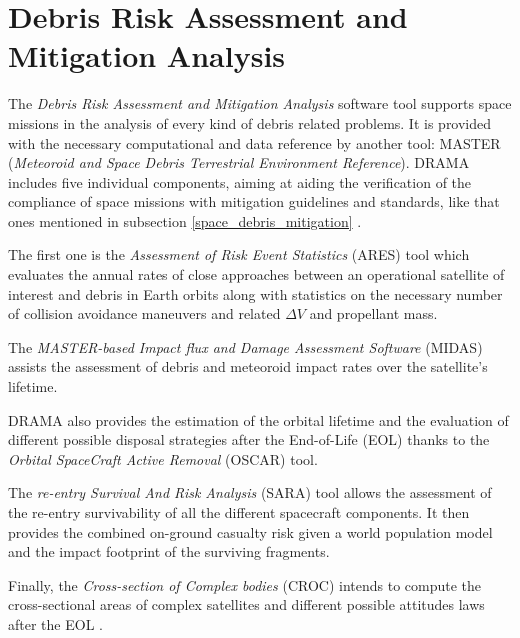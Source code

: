 \section{Debris Risk Assessment and Mitigation Analysis} \label{drama_section}
The \textit{Debris Risk Assessment and Mitigation Analysis} software tool supports space missions in the analysis of every kind of debris related problems.
It is provided with the necessary computational and data reference by another tool: MASTER (\textit{Meteoroid and Space Debris Terrestrial Environment Reference}).
DRAMA includes five individual components, aiming at  aiding the verification of the compliance of space missions with mitigation guidelines and standards, like that ones mentioned in subsection \ref{space_debris_mitigation} \cite{braun2013drama}.

The first one is the \textit{Assessment of Risk Event Statistics} (ARES) tool which evaluates the annual rates of close approaches between an operational satellite of interest and debris in Earth orbits along with statistics on the necessary number of collision avoidance maneuvers and related $\Delta V$ and propellant mass.

The \textit{MASTER-based Impact flux and Damage Assessment Software} (MIDAS) assists the assessment of debris and meteoroid impact rates over the satellite's lifetime.

DRAMA also provides the estimation of the orbital lifetime and the evaluation of different possible disposal strategies after the End-of-Life (EOL) thanks to the \textit{Orbital SpaceCraft Active Removal} (OSCAR) tool.

The \textit{re-entry Survival And Risk Analysis} (SARA) tool allows the assessment of the re-entry survivability of all the different spacecraft components. 
It then provides the combined on-ground casualty risk given a world population model and the impact footprint of the surviving fragments.  

Finally, the \textit{Cross-section of Complex bodies} (CROC) intends to compute the cross-sectional areas of complex satellites and different possible attitudes laws after the EOL \cite{braun2020drama}.

